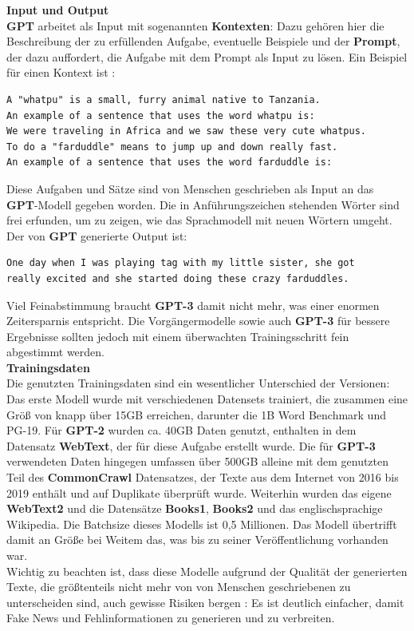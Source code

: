 \textbf{Input und Output}\\
\textbf{GPT} arbeitet als Input mit sogenannten \textbf{Kontexten}: Dazu geh\"oren hier die Beschreibung der zu erf\"ullenden Aufgabe, eventuelle Beispiele und der \textbf{Prompt}, der dazu auffordert, die Aufgabe mit dem Prompt als Input zu l\"osen. Ein Beispiel f\"ur einen Kontext ist \cite{gpt3}:
\begin{verbatim} 
A "whatpu" is a small, furry animal native to Tanzania. 
An example of a sentence that uses the word whatpu is:
We were traveling in Africa and we saw these very cute whatpus.
To do a "farduddle" means to jump up and down really fast. 
An example of a sentence that uses the word farduddle is:
\end{verbatim} 
Diese Aufgaben und S\"atze sind von Menschen geschrieben als Input an das \textbf{GPT}-Modell gegeben worden. Die in Anf\"uhrungszeichen stehenden W\"orter sind frei erfunden, um zu zeigen, wie das Sprachmodell mit neuen W\"ortern umgeht. Der von \textbf{GPT} generierte Output ist:
\begin{verbatim} 
One day when I was playing tag with my little sister, she got  
really excited and she started doing these crazy farduddles.
\end{verbatim} 
Viel Feinabstimmung braucht \textbf{GPT-3} damit nicht mehr, was einer enormen Zeitersparnis entspricht. Die Vorg\"angermodelle sowie auch \textbf{GPT-3} f\"ur bessere Ergebnisse sollten jedoch mit einem \"uberwachten Trainingsschritt fein abgestimmt werden.\\

\textbf{Trainingsdaten}\\
Die genutzten Trainingsdaten sind ein wesentlicher Unterschied der Versionen: Das erste Modell wurde mit verschiedenen Datensets trainiert, die zusammen eine Gr\"o{\ss} von knapp \"uber 15GB erreichen, darunter die 1B Word Benchmark und PG-19. F\"ur \textbf{GPT-2} wurden ca. 40GB Daten genutzt, enthalten in dem Datensatz \textbf{WebText}, der f\"ur diese Aufgabe erstellt wurde. Die f\"ur \textbf{GPT-3} verwendeten Daten hingegen umfassen \"uber 500GB alleine mit dem genutzten Teil des \textbf{CommonCrawl} Datensatzes, der Texte aus dem Internet von 2016 bis 2019 enth\"alt und auf Duplikate \"uberpr\"uft wurde. Weiterhin wurden das eigene \textbf{WebText2} und die Datens\"atze \textbf{Books1}, \textbf{Books2} und das englischsprachige Wikipedia. Die Batchsize dieses Modells ist 0,5 Millionen. Das Modell \"ubertrifft damit an Gr\"o{\ss}e bei Weitem das, was bis zu seiner Ver\"offentlichung vorhanden war.\\
Wichtig zu beachten ist, dass diese Modelle aufgrund der Qualit\"at der generierten Texte, die gr\"o{\ss}tenteils nicht mehr von von Menschen geschriebenen zu unterscheiden sind, auch gewisse Risiken bergen \cite{gpt3}: Es ist deutlich einfacher, damit Fake News und Fehlinformationen zu generieren und zu verbreiten.



